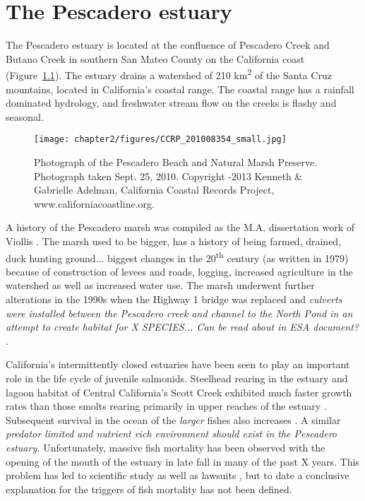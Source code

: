 \chapter{The Pescadero estuary} \label{chPescadero}

The Pescadero estuary is located at the confluence of Pescadero Creek and Butano Creek in southern San Mateo County on the California coast (Figure~\ref{fig:ccrp_2010}). The estuary drains a watershed of 210 km\textsuperscript{2} of the Santa Cruz mountains, located in California's coastal range. The coastal range has a rainfall dominated hydrology, and freshwater stream flow on the creeks is flashy and seasonal.


\begin{figure}
\texttt{[image: chapter2/figures/CCRP\_201008354\_small.jpg]} \caption{Photograph of the Pescadero Beach and Natural Marsh Preserve. Photograph taken Sept. 25,
2010. Copyright -2013 Kenneth \& Gabrielle
Adelman, California Coastal Records Project,
www.californiacoastline.org.} \label{fig:ccrp_2010} \end{figure}

A history of the Pescadero marsh was compiled as the M.A. dissertation work of Viollis \parencite*{viollis_evolution_1979}. The marsh used to be bigger, has a history of being farmed, drained, duck hunting ground... biggest changes in the 20\textsuperscript{th} century (as written in 1979) because of construction of levees and roads, logging, increased agriculture in the watershed as well as increased water use. The marsh underwent further alterations in the 1990s when the Highway 1 bridge was replaced and \emph{culverts were installed between the Pescadero creek and channel to the North Pond in an attempt to create habitat for X SPECIES... Can be read about in ESA document? \parencite{esa_pescadero-butano_2004}}.

California's intermittently closed estuaries have been seen to play an important role in the life cycle of juvenile salmonids. Steelhead rearing in the estuary and lagoon habitat of Central California's Scott Creek exhibited much faster growth rates than those smolts rearing primarily in upper reaches of the estuary \parencite{hayes_steelhead_2008}. Subsequent survival in the ocean of the \emph{larger} fishes also increases \parencite{bond_marine_2008}. A similar \emph{predator limited and nutrient rich environment should exist in the Pescadero estuary.} Unfortunately, massive fish mortality has been observed with the opening of the mouth of the estuary in late fall in many of the past X years. This problem has led to scientific study \parencite{sloan_ecological_2006, smith_inorganic_2009} as well as lawsuits \parencite{scheck_tiny_2012}, but to date a conclusive explanation for the triggers of fish mortality has not been defined. 

